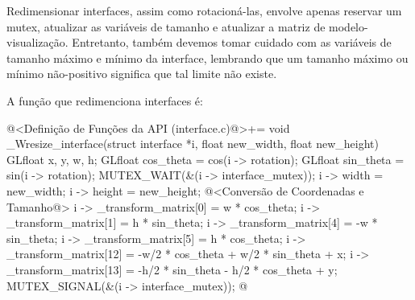 
Redimensionar interfaces, assim como rotacioná-las, envolve apenas
reservar um mutex, atualizar as variáveis de tamanho e atualizar a
matriz de modelo-visualização. Entretanto, também devemos tomar
cuidado com as variáveis de tamanho máximo e mínimo da interface,
lembrando que um tamanho máximo ou mínimo não-positivo significa que
tal limite não existe.

A função que redimenciona interfaces é:

\iniciocodigo
@<Definição de Funções da API (interface.c)@>+=
void _Wresize_interface(struct interface *i, float new_width, float new_height){
  GLfloat x, y, w, h;
  GLfloat cos_theta = cos(i -> rotation);
  GLfloat sin_theta = sin(i -> rotation);
  MUTEX_WAIT(&(i -> interface_mutex));
  i -> width = new_width;
  i -> height = new_height;
  @<Conversão de Coordenadas e Tamanho@>
  i -> _transform_matrix[0] = w * cos_theta;
  i -> _transform_matrix[1] = h * sin_theta;
  i -> _transform_matrix[4] = -w * sin_theta;
  i -> _transform_matrix[5] = h * cos_theta;
  i -> _transform_matrix[12] = -w/2 * cos_theta + w/2 * sin_theta + x;
  i -> _transform_matrix[13] = -h/2 * sin_theta - h/2 * cos_theta + y;
  MUTEX_SIGNAL(&(i -> interface_mutex));
}
@
\fimcodigo






\fim
